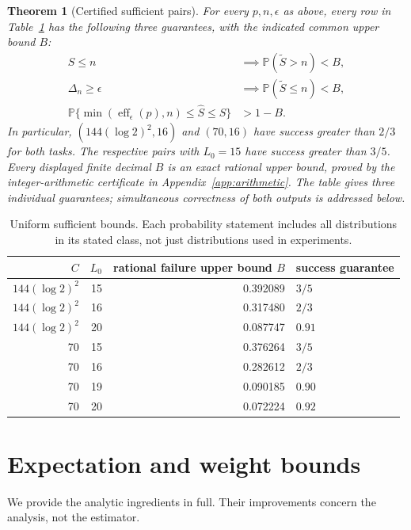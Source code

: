 \documentclass[10pt]{article}
\newtheorem{theorem}{Theorem}
\newcommand{\Prb}{\mathbb P}
\newcommand{\eff}{\operatorname{eff}}
\begin{document}
\begin{theorem}[Certified sufficient pairs]\label{thm:main}
For every $p,n,\epsilon$ as above, every row in Table~\ref{tab:constants}
has the following three guarantees, with the indicated common upper bound $B$:
\begin{align}
 S\le n&\implies\Prb(\widetilde S>n)<B,\label{eq:null}\\
 \Delta_n\ge\epsilon&\implies\Prb(\widetilde S\le n)<B,\label{eq:alternative}\\
 \Prb\{\min(\eff_\epsilon(p),n)\le\widehat S\le S\}&>1-B.
 \label{eq:joint}
\end{align}
In particular, $(144(\log2)^2,16)$ and $(70,16)$ have success greater than
$2/3$ for both tasks. The respective pairs with $L_0=15$ have success
greater than $3/5$. Every displayed finite decimal $B$ is an exact rational
upper bound, proved by the integer-arithmetic certificate in
Appendix~\ref{app:arithmetic}. The table gives three individual guarantees;
simultaneous correctness of both outputs is addressed below.
\end{theorem}

\begin{table}[h]
\centering
\begin{tabular}{rrrl}
\toprule
$C$ & $L_0$ & rational failure upper bound $B$ & success guarantee\\
\midrule
$144(\log2)^2$ &15&0.392089&$3/5$\\
$144(\log2)^2$ &16&0.317480&$2/3$\\
$144(\log2)^2$ &20&0.087747&$0.91$\\
70&15&0.376264&$3/5$\\
70&16&0.282612&$2/3$\\
70&19&0.090185&$0.90$\\
70&20&0.072224&$0.92$\\
\bottomrule
\end{tabular}
\caption{Uniform sufficient bounds. Each probability statement includes all
distributions in its stated class, not just distributions used in experiments.}
\label{tab:constants}
\end{table}

\section{Expectation and weight bounds}
We provide the analytic ingredients in full. Their improvements concern
the analysis, not the estimator.
\end{document}

